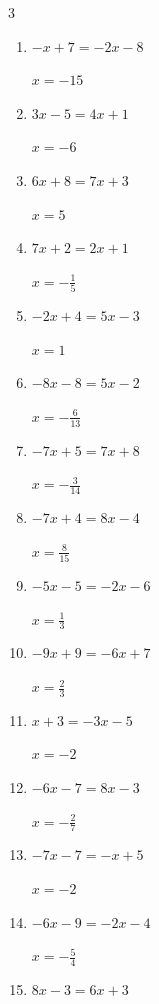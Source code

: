 \begin{multicols}{3}
\begin{enumerate}
  \item $-x+7=-2x-8$

        $\displaystyle x=-15$

  \item $3x-5=4x+1$

        $\displaystyle x=-6$

  \item $6x+8=7x+3$

        $\displaystyle x=5$

  \item $7x+2=2x+1$

        $\displaystyle x=-\frac{1}{5}$

  \item $-2x+4=5x-3$

        $\displaystyle x=1$

\columnbreak %

  \item $-8x-8=5x-2$

        $\displaystyle x=-\frac{6}{13}$

  \item $-7x+5=7x+8$

        $\displaystyle x=-\frac{3}{14}$

  \item $-7x+4=8x-4$

        $\displaystyle x=\frac{8}{15}$

  \item $-5x-5=-2x-6$

        $\displaystyle x=\frac{1}{3}$

  \item $-9x+9=-6x+7$

        $\displaystyle x=\frac{2}{3}$

  \item $x+3=-3x-5$

        $\displaystyle x=-2$

  \item $-6x-7=8x-3$

        $\displaystyle x=-\frac{2}{7}$

  \item $-7x-7=-x+5$

        $\displaystyle x=-2$

  \item $-6x-9=-2x-4$

        $\displaystyle x=-\frac{5}{4}$

  \item $8x-3=6x+3$


\end{enumerate}
\end{multicols}
